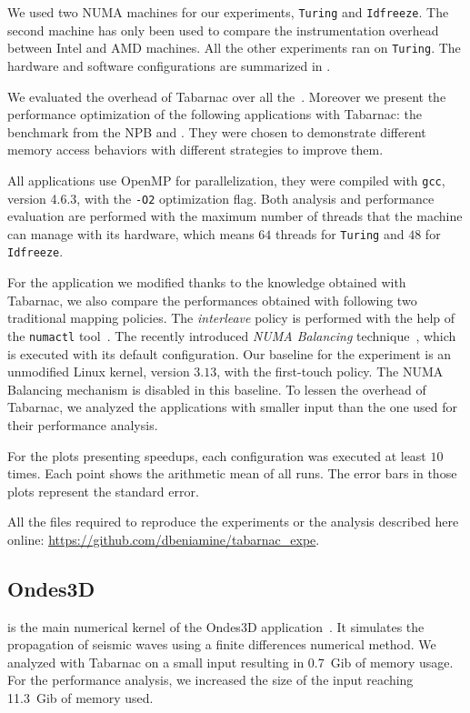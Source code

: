 We used two NUMA machines for our experiments, \texttt{Turing} and \texttt{Idfreeze}.
The second machine has only been used to compare the instrumentation overhead between Intel and AMD machines.
All the other experiments ran on \texttt{Turing}.
The hardware and software configurations are summarized in .

We evaluated the overhead of \gls{Tabarnac} over all the~\cite{Jin99NPBOpenMP}.
Moreover we present the performance optimization of the following applications with \gls{Tabarnac}: the \IS benchmark from the \gls{NPB} and \Ondes.
They were chosen to demonstrate different memory access behaviors with different strategies to improve them.

All applications use OpenMP for parallelization, they were compiled with \texttt{gcc}, version 4.6.3, with the \texttt{-O2} optimization flag.
Both analysis and performance evaluation are performed with the maximum number of threads that the machine can manage with its hardware, which means $64$ threads for \texttt{Turing} and $48$ for \texttt{Idfreeze}.

For the application we modified thanks to the knowledge obtained with \gls{Tabarnac}, we also compare the performances obtained with following two traditional mapping policies.
The \emph{interleave} policy is performed with the help of the \texttt{numactl} tool~\cite{Kleen05NUMA}.
The recently introduced \emph{NUMA Balancing} technique~\cite{Corbet12Toward}, which is executed with its default configuration.
Our baseline for the experiment is an unmodified Linux kernel, version $3.13$, with the first-touch policy.
The NUMA Balancing mechanism is disabled in this baseline.
To lessen the overhead of \gls{Tabarnac}, we analyzed the applications with smaller input than the one used for their performance analysis.

For the plots presenting speedups, each configuration was executed at least $10$ times.
Each point shows the arithmetic mean of all runs.
The error bars in those plots represent the standard error.

All the files required to reproduce the experiments  or the analysis described here online: \url{https://github.com/dbeniamine/tabarnac\_expe}.

\subsection{Ondes3D}
\label{sec:tab-ondes3d}

\Ondes is the main numerical kernel of the Ondes3D application~\cite{Dupros08Exploiting}.
It simulates the propagation of seismic waves using a finite differences numerical method.
We analyzed \Ondes with \gls{Tabarnac} on a small input resulting in \SI{0.7}{Gib} of memory usage.
For the performance analysis, we increased the size of the input reaching \SI{11.3}{Gib} of memory used.

